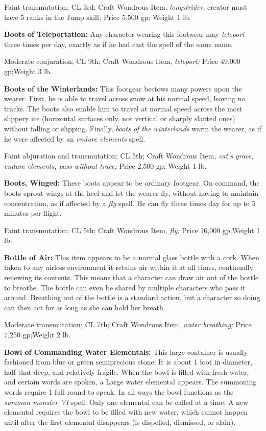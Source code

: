 Faint transmutation; CL 3rd; Craft Wondrous Item, \textit{longstrider}, creator 
must have 5 ranks in the Jump skill\textit{; }Price 5,500 gp; Weight 1 lb.

\textbf{Boots of Teleportation:} Any character wearing this footwear may \textit{teleport 
}three times per day, exactly as if he had cast the spell of the same name.

Moderate conjuration; CL 9th; Craft Wondrous Item, \textit{teleport; }Price 49,000 
gp;Weight 3 lb.

\textbf{Boots of the Winterlands:} This footgear bestows many powers upon the wearer. 
First, he is able to travel across snow at his normal speed, leaving no tracks. 
The boots also enable him to travel at normal speed across the most slippery ice 
(horizontal surfaces only, not vertical or sharply slanted ones) without falling 
or slipping. Finally, \textit{boots of the winterlands }warm the wearer, as if 
he were affected by an \textit{endure elements }spell.

Faint abjuration and transmutation; CL 5th; Craft Wondrous Item\textit{, cat's 
grace, endure elements, pass without trace; }Price 2,500 gp; Weight 1 lb.

\textbf{Boots, Winged:} These boots appear to be ordinary footgear. On command, 
the boots sprout wings at the heel and let the wearer fly, without having to maintain 
concentration, as if affected by a \textit{fly }spell. He can fly three times day 
for up to 5 minutes per flight.

Faint transmutation; CL 5th; Craft Wondrous Item, \textit{fly; }Price 16,000 gp;Weight 
1 lb.

\textbf{Bottle of Air:} This item appears to be a normal glass bottle with a cork. 
When taken to any airless environment it retains air within it at all times, continually 
renewing its contents. This means that a character can draw air out of the bottle 
to breathe. The bottle can even be shared by multiple characters who pass it around. 
Breathing out of the bottle is a standard action, but a character so doing can 
then act for as long as she can hold her breath.

Moderate transmutation; CL 7th; Craft Wondrous Item, \textit{water breathing; }Price 
7,250 gp;Weight 2 lb.

\textbf{Bowl of Commanding Water Elementals:} This large container is usually fashioned 
from blue or green semiprecious stone. It is about 1 foot in diameter, half that 
deep, and relatively fragile. When the bowl is filled with fresh water, and certain 
words are spoken, a Large water elemental appears. The summoning words require 
1 full round to speak. In all ways the bowl functions as the \textit{summon monster 
VI }spell. Only one elemental can be called at a time. A new elemental requires 
the bowl to be filled with new water, which cannot happen until after the first 
elemental disappears (is dispelled, dismissed, or slain).

